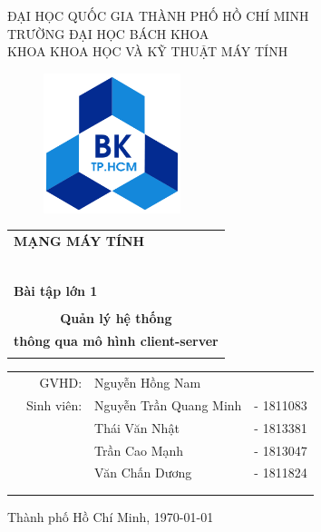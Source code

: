 \documentclass[a4paper,11pt]{extarticle}
\begin{document}
\begin{titlepage}
\begin{center}
ĐẠI HỌC QUỐC GIA THÀNH PHỐ HỒ CHÍ MINH \\
TRƯỜNG ĐẠI HỌC BÁCH KHOA \\
KHOA KHOA HỌC VÀ KỸ THUẬT MÁY TÍNH
\end{center}

\vspace{1cm}

\begin{figure}[h!]
\begin{center}
\includegraphics[width=4cm]{hcmut.png}
\end{center}
\end{figure}

\vspace{1cm}


\begin{center}
\begin{tabular}{c}
\multicolumn{1}{l}{\textbf{{\Large MẠNG MÁY TÍNH}}}\\
~~\\
\hline
\\
\multicolumn{1}{l}{\textbf{{\Large Bài tập lớn 1}}}\\
\\
\textbf{{\Huge Quản lý hệ thống }}\\
\textbf{{\Huge thông qua mô hình client-server}}\\
\\
\hline
\end{tabular}
\end{center}

\vspace{1cm}

\begin{table}[h]
\begin{tabular}{rrll}
\hspace{3 cm} & GVHD: & Nguyễn Hồng Nam\\
 & Sinh viên: & Nguyễn Trần Quang Minh & - 1811083 \\
 &          & Thái Văn Nhật	& - 1813381 \\
 &          & Trần Cao Mạnh	& - 1813047 \\
 &          & Văn Chấn Dương & - 1811824\\ 
\\
\vspace{2cm}
\end{tabular}
\end{table}

\begin{center}
{\footnotesize Thành phố Hồ Chí Minh,  \monthyeardate\today}
\end{center}
\end{titlepage}
\end{document}
